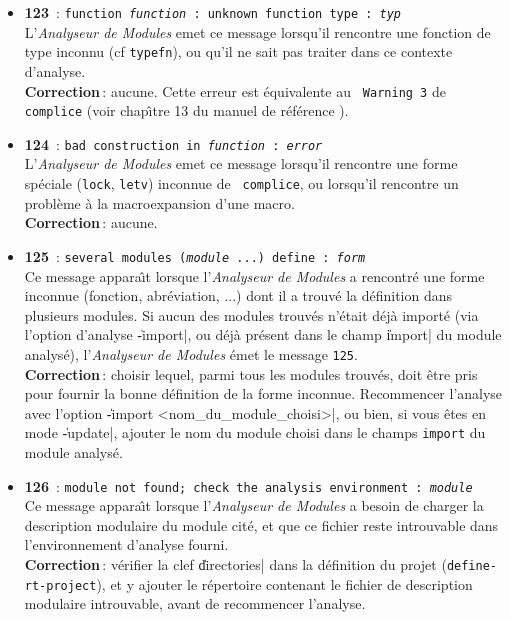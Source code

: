 \begin{itemize}
\item {\Large {\bf 123}}\ : {\tt function {\em function}\,: unknown
function type\,: {\em typ}}\\ 
L'{\em Analyseur de Modules} emet ce message lorsqu'il rencontre une
fonction de type inconnu (cf {\tt typefn}), ou qu'il ne sait pas
traiter dans ce contexte d'analyse. \\
{\bf Correction}\,: aucune. Cette erreur est \'{e}quivalente au {\tt
Warning 3} de {\tt complice} (voir chap\^{\i}tre 13 du manuel de
r\'{e}f\'{e}rence \LeLisp).

\item {\Large {\bf 124}}\ : {\tt bad construction in {\em function} : {\em error}}\\
L'{\em Analyseur de Modules} emet ce message lorsqu'il rencontre une
forme sp\'{e}ciale ({\tt lock}, {\tt letv}) inconnue de {\tt
complice}, ou lorsqu'il rencontre un probl\`{e}me \`{a} la macroexpansion
d'une macro. \\
{\bf Correction}\,: aucune.

\item {\Large {\bf 125}}\ : {\tt several modules ({\em module} ...) define :
{\em form}}\\
Ce message appara\^{\i}t lorsque l'{\em Analyseur de Modules} a rencontr\'{e}
une forme inconnue (fonction, abr\'{e}viation, ...) dont il a trouv\'{e} la
d\'{e}finition dans plusieurs modules. Si aucun des modules trouv\'{e}s
n'\'{e}tait d\'{e}j\`{a} import\'{e} (via l'option d'analyse \|-import|, ou d\'{e}j\`{a}
pr\'{e}sent dans le champ \|import| du module analys\'{e}), l'{\em Analyseur
de Modules} \'{e}met le message {\tt 125}. \\
{\bf Correction}\,: choisir lequel, parmi tous les modules trouv\'{e}s,
doit \^{e}tre pris pour fournir la bonne d\'{e}finition de la forme
inconnue. Recommencer l'analyse avec l'option \|-import
<nom_du_module_choisi>|, ou bien, si vous \^{e}tes en mode \|-update|,
ajouter le nom du module choisi
dans le champs {\tt import} du module analys\'{e}. 

\item {\Large {\bf 126}}\ : {\tt module not found; check the analysis
environment : {\em module}}\\
Ce message appara\^{\i}t lorsque l'{\em Analyseur de Modules} a besoin de
charger la description modulaire du module cit\'{e}, 
et que ce fichier reste introuvable dans l'environnement
d'analyse fourni. \\
{\bf Correction}\,: v\'{e}rifier la clef \|directories| dans la d\'{e}finition
du projet ({\tt define-rt-project}), et y ajouter le r\'{e}pertoire
contenant le fichier de description modulaire introuvable, avant de
recommencer l'analyse.


\end{itemize}
